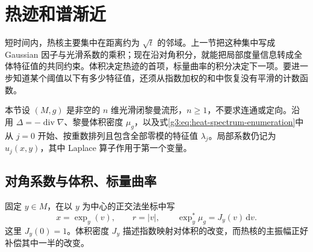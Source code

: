 
% 
% 

\section{热迹和谱渐近}
\label{g3:sec:1603}

短时间内，热核主要集中在距离约为 \(\sqrt t\) 的邻域。上一节把这种集中写成 Gaussian 因子与光滑系数的乘积；现在沿对角积分，就能把局部度量信息转成全体特征值的共同约束。体积决定热迹的首项，标量曲率的积分决定下一项。要进一步知道某个阈值以下有多少特征值，还须从指数加权的和中恢复没有平滑的计数函数。

\ProseParagraphBreak

本节设 \((M,g)\) 是非空的 \(n\) 维光滑闭黎曼流形，\(n\ge1\)，不要求连通或定向。沿用 \(\Delta=-\operatorname{div}\nabla\)、黎曼体积密度 \(\mu_g\)，以及式\eqref{g3:eq:heat-spectrum-enumeration}中从 \(j=0\) 开始、按重数排列且包含全部零模的特征值 \(\lambda_j\)。局部系数仍记为 \(u_j(x,y)\)，其中 Laplace 算子作用于第一个变量。

\subsection{对角系数与体积、标量曲率}
\label{g3:subsec:1603:01}
固定 \(y\in M\)，在以 \(y\) 为中心的正交法坐标中写
\[
	x=\exp_y(v),\qquad r=|v|,\qquad
	\exp_y^*\mu_g=J_y(v)\,\mathrm dv.
\]
这里 \(J_y(0)=1\)。体积密度 \(J_y\) 描述指数映射对体积的改变，而热核的主振幅正好补偿其中一半的改变。

